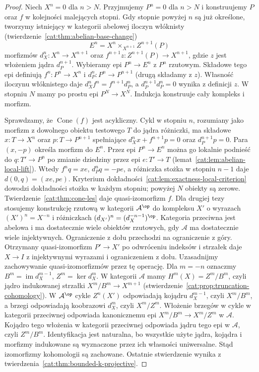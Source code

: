 \begin{proof}
Niech $X^n=0$ dla $n>N$. Przyjmujemy $P^n=0$ dla $n>N$ i konstruujemy $P$ oraz $f$ w kolejności malejących stopni. Gdy stopnie powyżej $n$ są już określone, tworzymy istniejący w kategorii abelowej iloczyn włóknisty (twierdzenie~\ref{cat:thm:abelian-base-change})
\[
 E^n=X^n\times_{X^{n+1}} Z^{n+1}(P)
\]
morfizmów $d_X^n:X^n\to X^{n+1}$ oraz $f^{n+1}z:Z^{n+1}(P)\to X^{n+1}$, gdzie $z$ jest włożeniem jądra $d_P^{n+1}$. Wybieramy epi $P^n\to E^n$ z $P^n$ rzutowym. Składowe tego epi definiują $f^n:P^n\to X^n$ i $d_P^n:P^n\to P^{n+1}$ (drugą składamy z $z$). Własność iloczynu włóknistego daje $d_X^nf^n=f^{n+1}d_P^n$, a $d_P^{n+1}d_P^n=0$ wynika z definicji $z$. W stopniu $N$ mamy po prostu epi $P^N\to X^N$. Indukcja konstruuje cały kompleks i morfizm.

Sprawdzamy, że $\operatorname{Cone}(f)$ jest acykliczny. Cykl w stopniu $n$, rozumiany jako morfizm z dowolnego obiektu testowego $T$ do jądra różniczki, ma składowe $x:T\to X^n$ oraz $p:T\to P^{n+1}$ spełniające $d_X^nx+f^{n+1}p=0$ oraz $d_P^{n+1}p=0$. Para $(x,-p)$ określa morfizm do $E^n$. Przez epi $P^n\to E^n$ można go lokalnie podnieść do $q:T'\to P^n$ po zmianie dziedziny przez epi $e:T'\to T$ (lemat~\ref{cat:lem:abelian-local-lift}). Wtedy $f^nq=xe$, $d_P^nq=-pe$, a różniczka stożka w stopniu $n-1$ daje $d(0,q)=(xe,pe)$. Kryterium dokładności~\ref{cat:lem:exactness-local-criterion} dowodzi dokładności stożka w każdym stopniu; powyżej $N$ obiekty są zerowe. Twierdzenie~\ref{cat:thm:cone-les} daje quasi-izomorfizm $f$. Dla drugiej tezy stosujemy konstrukcję rzutową w kategorii $\mathcal A^{\op}$ do kompleksu $X'$ o wyrazach $(X')^n=X^{-n}$ i różniczkach $(d_{X'})^n=(d_X^{-n-1})^{\op}$. Kategoria przeciwna jest abelowa i ma dostatecznie wiele obiektów rzutowych, gdy $\mathcal A$ ma dostatecznie wiele injektywnych. Ograniczenie z dołu przechodzi na ograniczenie z góry. Otrzymany quasi-izomorfizm $P'\to X'$ po odwróceniu indeksów i strzałek daje $X\to I$ z injektywnymi wyrazami i ograniczeniem z dołu. Uzasadnijmy zachowywanie quasi-izomorfizmów przez tę operację. Dla $m=-n$ oznaczmy $B^m=\operatorname{im}d_X^{m-1}$, $Z^m=\ker d_X^m$. W kategorii $\mathcal A$ mamy $H^m(X)=Z^m/B^m$, czyli jądro indukowanej strzałki $X^m/B^m\to X^{m+1}$ (stwierdzenie~\ref{cat:prop:truncation-cohomology}). W $\mathcal A^{\op}$ cykle $Z^n(X')$ odpowiadają kojądru $d_X^{m-1}$, czyli $X^m/B^m$, a brzegi odpowiadają koobrazowi $d_X^m$, czyli $X^m/Z^m$. Włożenie brzegów w cykle w kategorii przeciwnej odpowiada kanonicznemu epi $X^m/B^m\to X^m/Z^m$ w $\mathcal A$. Kojądro tego włożenia w kategorii przeciwnej odpowiada jądru tego epi w $\mathcal A$, czyli $Z^m/B^m$. Identyfikacja jest naturalna, bo wszystkie użyte jądra, kojądra i morfizmy indukowane są wyznaczone przez ich własności uniwersalne. Stąd izomorfizmy kohomologii są zachowane. Ostatnie stwierdzenie wynika z twierdzenia~\ref{cat:thm:bounded-k-projective}.
\end{proof}
